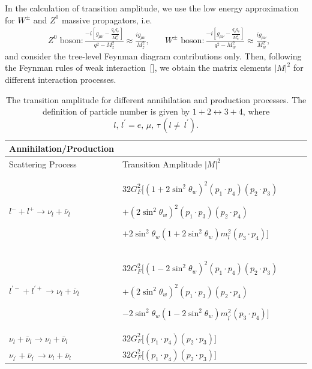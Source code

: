 In the calculation of transition amplitude, we use the low energy approximation for $W^\pm$ and $Z^0$ massive propagators, i.e.
\begin{align}
&\mbox{$Z^0$ boson}:\frac{-i\left[g_{\mu\nu}-\frac{q_\mu q_\nu}{M^2_z}\right]}{q^2-M^2_z}\approx\frac{ig_{\mu\nu}}{M^2_z},\quad
&\mbox{$W^\pm$ boson}:\frac{-i\left[g_{\mu\nu}-\frac{q_\mu q_\nu}{M^2_w}\right]}{q^2-M^2_w}\approx\frac{ig_{\mu\nu}}{M^2_w},
\end{align}
and consider the tree-level Feynman diagram contributions only. Then, following the Feynman rules of weak interaction~[\cite{Griffiths:2008zz}], we obtain the matrix elements $|M|^2$ for different  interaction processes.
\begin{table}[h]
\centering
\begin{tabular}{lp{8cm}lp{8cm}l}
\hline\hline
Annihilation/Production \\
\hline\hline
Scattering Process & Transition Amplitude $|M|^2$ \\
\hline
$l^-+l^+\longrightarrow\nu_l+\bar{\nu}_l$ &$ 32G^2_F\bigg[\left(1+2\sin^2\theta_w\right)^2\left(p_1\cdot p_4\right)\left(p_2\cdot p_3\right)$

$+\left(2\sin^2\theta_w\right)^2\left(p_1\cdot p_3\right)\left(p_2\cdot p_4\right)$

$+2\sin^2\theta_w\left(1+2\sin^2\theta_w\right)m^2_l\left(p_3\cdot p_4\right)\bigg]$ \\
\hline
$l^{\prime-}+l^{\prime+}\longrightarrow\nu_l+\bar{\nu}_l$ & $32G^2_F\bigg[\left(1-2\sin^2\theta_w\right)^2\left(p_1\cdot p_4\right)\left(p_2\cdot p_3\right)$

$+\left(2\sin^2\theta_w\right)^2\left(p_1\cdot p_3\right)\left(p_2\cdot p_4\right)$

$-2\sin^2\theta_w\left(1-2\sin^2\theta_w\right)m^2_{l^\prime}\left(p_3\cdot p_4\right)\bigg]$ \\
\hline
$\nu_l+\bar{\nu}_l\longrightarrow\nu_l+\bar{\nu}_l$ &
$32G^2_F\bigg[\left(p_1\cdot p_4\right)\left(p_2\cdot p_3\right)\bigg]$ \\
\hline
$\nu_{l^\prime}+\bar{\nu}_{l^\prime}\longrightarrow\nu_l+\bar{\nu}_l$ &
$32G^2_F\bigg[\left(p_1\cdot p_4\right)\left(p_2\cdot p_3\right)\bigg]$ \\
\hline\hline
\end{tabular}
\caption{The transition amplitude for different annihilation and production processes. The definition of particle number is given by $1+2\leftrightarrow3+4$, where $l,\,l^\prime=e,\,\mu,\,\tau\,(l\neq\,l^\prime)$.}
\label{T005}
\end{table}
